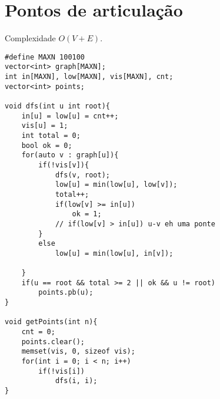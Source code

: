 \section{Pontos de articulação}

Complexidade $O(V+E)$.
\begin{multicols}{2}
	\begin{lstlisting}
#define MAXN 100100
vector<int> graph[MAXN];
int in[MAXN], low[MAXN], vis[MAXN], cnt;
vector<int> points;

void dfs(int u int root){
	in[u] = low[u] = cnt++;
	vis[u] = 1;
	int total = 0;	
	bool ok = 0;
	for(auto v : graph[u]){
		if(!vis[v]){
			dfs(v, root);
			low[u] = min(low[u], low[v]);
			total++;
			if(low[v] >= in[u])
				ok = 1;
			// if(low[v] > in[u]) u-v eh uma ponte
		}
		else
			low[u] = min(low[u], in[v]);
		
	}
	if(u == root && total >= 2 || ok && u != root)
		points.pb(u);
}

void getPoints(int n){
	cnt = 0;
	points.clear();
	memset(vis, 0, sizeof vis);
	for(int i = 0; i < n; i++)
		if(!vis[i])
			dfs(i, i);
}
\end{lstlisting}
\end{multicols}
